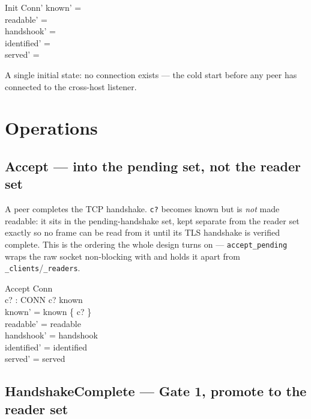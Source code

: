 \documentclass[a4paper,10pt,fleqn]{article}
\begin{document}
\begin{schema}{Init}
  Conn'
\where
  known' = \emptyset \\
  readable' = \emptyset \\
  handshook' = \emptyset \\
  identified' = \emptyset \\
  served' = \emptyset
\end{schema}

A single initial state: no connection exists --- the cold start before any
peer has connected to the cross-host listener.

\section{Operations}

\subsection{Accept --- into the pending set, not the reader set}

A peer completes the TCP handshake.  \texttt{c?} becomes known but is
\emph{not} made readable: it sits in the pending-handshake set, kept
separate from the reader set exactly so no frame can be read from it until
its TLS handshake is verified complete.  This is the ordering the whole
design turns on --- \texttt{accept\_pending} wraps the raw socket
non-blocking with  and holds it
apart from \texttt{\_clients}/\texttt{\_readers}.

\begin{schema}{Accept}
  \Delta Conn \\
  c? : CONN
\where
  c? \notin known \\
  known' = known \cup \{ c? \} \\
  readable' = readable \\
  handshook' = handshook \\
  identified' = identified \\
  served' = served
\end{schema}

\subsection{HandshakeComplete --- Gate 1, promote to the reader set}
\end{document}
